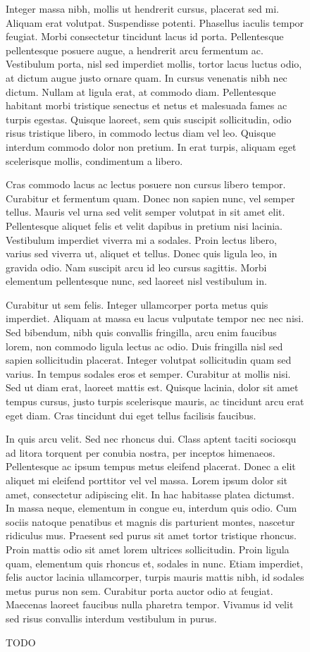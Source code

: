 \begin{figure}
{  Integer massa nibh, mollis ut hendrerit cursus, placerat sed mi. Aliquam erat volutpat. Suspendisse potenti. Phasellus iaculis tempor feugiat. Morbi consectetur tincidunt lacus id porta. Pellentesque pellentesque posuere augue, a hendrerit arcu fermentum ac. Vestibulum porta, nisl sed imperdiet mollis, tortor lacus luctus odio, at dictum augue justo ornare quam. In cursus venenatis nibh nec dictum. Nullam at ligula erat, at commodo diam. Pellentesque habitant morbi tristique senectus et netus et malesuada fames ac turpis egestas. Quisque laoreet, sem quis suscipit sollicitudin, odio risus tristique libero, in commodo lectus diam vel leo. Quisque interdum commodo dolor non pretium. In erat turpis, aliquam eget scelerisque mollis, condimentum a libero.
  
  Cras commodo lacus ac lectus posuere non cursus libero tempor. Curabitur et fermentum quam. Donec non sapien nunc, vel semper tellus. Mauris vel urna sed velit semper volutpat in sit amet elit. Pellentesque aliquet felis et velit dapibus in pretium nisi lacinia. Vestibulum imperdiet viverra mi a sodales. Proin lectus libero, varius sed viverra ut, aliquet et tellus. Donec quis ligula leo, in gravida odio. Nam suscipit arcu id leo cursus sagittis. Morbi elementum pellentesque nunc, sed laoreet nisl vestibulum in.
  
  Curabitur ut sem felis. Integer ullamcorper porta metus quis imperdiet. Aliquam at massa eu lacus vulputate tempor nec nec nisi. Sed bibendum, nibh quis convallis fringilla, arcu enim faucibus lorem, non commodo ligula lectus ac odio. Duis fringilla nisl sed sapien sollicitudin placerat. Integer volutpat sollicitudin quam sed varius. In tempus sodales eros et semper. Curabitur at mollis nisi. Sed ut diam erat, laoreet mattis est. Quisque lacinia, dolor sit amet tempus cursus, justo turpis scelerisque mauris, ac tincidunt arcu erat eget diam. Cras tincidunt dui eget tellus facilisis faucibus.
  
  In quis arcu velit. Sed nec rhoncus dui. Class aptent taciti sociosqu ad litora torquent per conubia nostra, per inceptos himenaeos. Pellentesque ac ipsum tempus metus eleifend placerat. Donec a elit aliquet mi eleifend porttitor vel vel massa. Lorem ipsum dolor sit amet, consectetur adipiscing elit. In hac habitasse platea dictumst. In massa neque, elementum in congue eu, interdum quis odio. Cum sociis natoque penatibus et magnis dis parturient montes, nascetur ridiculus mus. Praesent sed purus sit amet tortor tristique rhoncus. Proin mattis odio sit amet lorem ultrices sollicitudin. Proin ligula quam, elementum quis rhoncus et, sodales in nunc. Etiam imperdiet, felis auctor lacinia ullamcorper, turpis mauris mattis nibh, id sodales metus purus non sem. Curabitur porta auctor odio at feugiat. Maecenas laoreet faucibus nulla pharetra tempor. Vivamus id velit sed risus convallis interdum vestibulum in purus.
  
   TODO}
  \label{fig:moduledecomp}
\end{figure}
